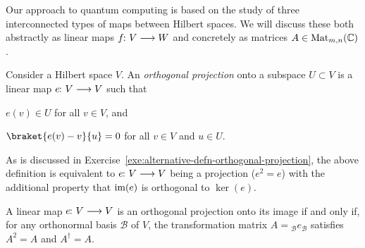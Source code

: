 \documentclass[a4paper, oneside, 12pt]{amsart}
\begin{document}
Our approach to quantum computing is based on the study of three interconnected types of maps between Hilbert spaces.
We will discuss these both abstractly as linear maps \(f \from V \to W\) and concretely as matrices \(A \in \operatorname{Mat}_{m,n}( \mathbb{C})\).

\begin{definition}\label{def:orthogonal-projection}
  Consider a Hilbert space \(V\).
  An \emph{orthogonal projection} onto a subspace \( U \subset V \) is a linear map \( e\from V \to V \) such that
  \begin{thmlist}
    \item \( e(v) \in U \) for all \( v \in V \), and
    \item \( \braket{e(v) - v}{u} = 0 \) for all \( v \in V \) and \( u \in U \).
  \end{thmlist}
\end{definition}

As is discussed in Exercise~\ref{exe:alternative-defn-orthogonal-projection}, the above definition is equivalent to \( e\from V\to V \) being a projection (\ie \( e^2 = e \)) with the additional property that \( \operatorname{im}(e) \) is orthogonal to \( \ker(e) \).

\begin{lemma}\label{lem:representing-orthogonal-projection}
  A linear map \( e \from V \to V \) is an orthogonal projection onto its image if and only if, for any orthonormal basis \( \mathcal{B} \) of \( V \), the transformation matrix \( A = {_{\mathcal{B}}} e_{\mathcal{B}}\) satisfies \(A^{2} = A\) and \(A^{\dagger} = A\).
\end{lemma}
\end{document}
